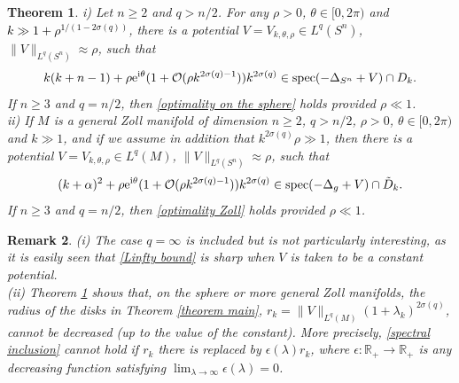 \documentclass[12pt]{amsart}
\newcommand{\e}{{\rm e}}
\newcommand{\R}{{\mathbb R}}
\newcommand\eps{\epsilon}
\newcommand\I{\mathrm{i}}
\DeclareMathOperator{\spec}{spec}
\newcommand\jc[1]{\textcolor{black}{#1}}
\newtheorem{theorem}{Theorem}[section]
\newtheorem{remark}[theorem]{Remark}
\begin{document}
\begin{theorem}\label{theorem optimality sphere}
i) Let $n\geq 2$ and $q>n/2$. 
For any $\rho>0$, $\theta\in [0,2\pi)$ and \jc{$k\gg 1+\rho^{1/(1-2\sigma(q))}$},
there is a potential $V=V_{k,\theta,\rho} \in L^{q}(S^n)$, $\|V\|_{L^{q}(S^n)}\approx \rho$, such that
    \begin{align}\label{optimality on the sphere}
    k(k+n-1)+\rho\e^{\I\theta}(1+\mathcal{O}(\rho k^{2\sigma(q)-1})) k^{2\sigma(q)}\in \spec(-\Delta_{S^n}+V)\cap D_{k}. 
\end{align}
If $n\geq 3$ and $q=n/2$, then \eqref{optimality on the sphere} holds provided $\rho\ll 1$.\\

\noindent ii) If $M$ is a general Zoll manifold of dimension $n\geq 2$, $q>n/2$, $\rho>0$, $\theta\in [0,2\pi)$ and $k\gg 1$, and if we assume in addition that $k^{2\sigma(q)}\rho\gg 1$, then there is a potential $V=V_{k,\theta,\rho} \in L^{q}(M)$, $\|V\|_{L^{q}(S^n)}\approx \rho$, such that
    \begin{align}\label{optimality Zoll}
    (k+\alpha)^2+\rho\e^{\I\theta}(1+\mathcal{O}(\rho k^{2\sigma(q)-1})) k^{2\sigma(q)}\in \spec(-\Delta_g+V)\cap \tilde{D}_{k}. 
\end{align}
If $n\geq 3$ and $q=n/2$, then \eqref{optimality Zoll} holds provided $\rho\ll 1$.
\end{theorem}


\begin{remark}\label{remark theorem optimality}
 (i) The case $q=\infty$ is included but is not particularly interesting, as it is easily seen that \eqref{Linfty bound} is sharp when  $V$ is taken to be a constant potential.\\

 \noindent (ii) Theorem \ref{theorem optimality sphere} shows that, on the sphere or more general Zoll manifolds, the radius of the disks in Theorem \ref{theorem main}, $r_k=\|V\|_{L^q(M)}(1+\lambda_k)^{2\sigma(q)}$, cannot be decreased (up to the value of the constant). More precisely, \eqref{spectral inclusion} cannot hold if $r_k$ there is replaced by $\eps(\lambda)r_k$, where $\eps:\R_+\to\R_+$ is any decreasing function satisfying $\lim_{\lambda\to\infty}\eps(\lambda)=0$. 
\end{remark}




 
 
\end{document}
